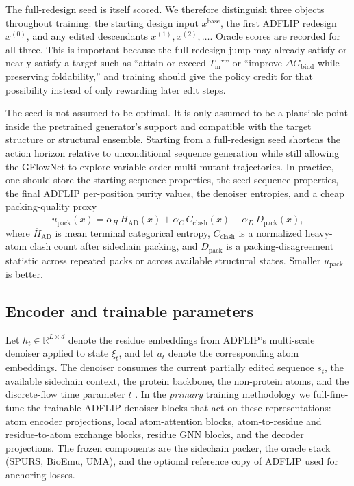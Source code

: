 \documentclass[11pt]{article}
\newcommand{\RR}{\mathbb{R}}
\newcommand{\packunc}{\ensuremath{u_{\mathrm{pack}}}}
\newcommand{\Tm}{\ensuremath{T_{\mathrm m}}}
\newcommand{\DGbind}{\ensuremath{\Delta G_{\mathrm{bind}}}}
\begin{document}
The full-redesign seed is itself scored. We therefore distinguish three objects throughout training: the starting design input $x^{\mathrm{base}}$, the first ADFLIP redesign $x^{(0)}$, and any edited descendants $x^{(1)},x^{(2)},\ldots$. Oracle scores are recorded for all three. This is important because the full-redesign jump may already satisfy or nearly satisfy a target such as ``attain or exceed $\Tm^\star$'' or ``improve \DGbind{} while preserving foldability,'' and training should give the policy credit for that possibility instead of only rewarding later edit steps.

The seed is not assumed to be optimal. It is only assumed to be a plausible point inside the pretrained generator's support and compatible with the target structure or structural ensemble. Starting from a full-redesign seed shortens the action horizon relative to unconditional sequence generation while still allowing the GFlowNet to explore variable-order multi-mutant trajectories. In practice, one should store the starting-sequence properties, the seed-sequence properties, the final ADFLIP per-position purity values, the denoiser entropies, and a cheap packing-quality proxy
\begin{equation}
\label{eq:packuncdef}
    \packunc(x)=\alpha_H\,\overline{H}_{\mathrm{AD}}(x)+\alpha_C\,C_{\mathrm{clash}}(x)+\alpha_D\,D_{\mathrm{pack}}(x),
\end{equation}
where $\overline{H}_{\mathrm{AD}}$ is mean terminal categorical entropy, $C_{\mathrm{clash}}$ is a normalized heavy-atom clash count after sidechain packing, and $D_{\mathrm{pack}}$ is a packing-disagreement statistic across repeated packs or across available structural states. Smaller \packunc{} is better.



\subsection{Encoder and trainable parameters}

Let $h_t \in \RR^{L\times d}$ denote the residue embeddings from ADFLIP's multi-scale denoiser applied to state $\xi_t$, and let $a_t$ denote the corresponding atom embeddings. The denoiser consumes the current partially edited sequence $s_t$, the available sidechain context, the protein backbone, the non-protein atoms, and the discrete-flow time parameter $t$ \citep{yi2025adflip}. In the \emph{primary} training methodology we full-fine-tune the trainable ADFLIP denoiser blocks that act on these representations: atom encoder projections, local atom-attention blocks, atom-to-residue and residue-to-atom exchange blocks, residue GNN blocks, and the decoder projections. The frozen components are the sidechain packer, the oracle stack (SPURS, BioEmu, UMA), and the optional reference copy of ADFLIP used for anchoring losses.
\end{document}
